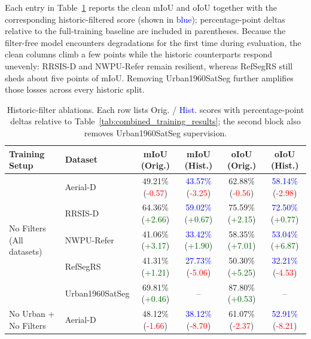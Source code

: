 Each entry in Table~\ref{tab:historic_ablation_results} reports the clean mIoU and oIoU together with the corresponding historic-filtered score (shown in \textcolor{blue}{blue}); percentage-point deltas relative to the full-training baseline are included in parentheses. Because the filter-free model encounters degradations for the first time during evaluation, the clean columns climb a few points while the historic counterparts respond unevenly: RRSIS-D and NWPU-Refer remain resilient, whereas RefSegRS still sheds about five points of mIoU. Removing Urban1960SatSeg further amplifies those losses across every historic split.
\begin{table}[t]
\centering
\caption{Historic-filter ablations. Each row lists Orig. / \textcolor{blue}{Hist.} scores with percentage-point deltas relative to Table~\ref{tab:combined_training_results}; the second block also removes Urban1960SatSeg supervision.}
\label{tab:historic_ablation_results}
\renewcommand{\arraystretch}{1.1}
\begin{tabular}{@{}llcccc@{}}
\toprule
\textbf{Training Setup} & \textbf{Dataset} & \textbf{mIoU (Orig.)} & \textbf{mIoU (Hist.)} & \textbf{oIoU (Orig.)} & \textbf{oIoU (Hist.)} \\
\midrule
\multirow{5}{*}{No Filters (All datasets)} & Aerial-D & 49.21\% (\textcolor{red}{-0.57}) & \textcolor{blue}{43.57\%} (\textcolor{red}{-3.25}) & 62.88\% (\textcolor{red}{-0.56}) & \textcolor{blue}{58.14\%} (\textcolor{red}{-2.98}) \\
 & RRSIS-D & 64.36\% (\textcolor{darkgreen}{+2.66}) & \textcolor{blue}{59.02\%} (\textcolor{darkgreen}{+0.67}) & 75.59\% (\textcolor{darkgreen}{+2.15}) & \textcolor{blue}{72.50\%} (\textcolor{darkgreen}{+0.77}) \\
 & NWPU-Refer & 41.06\% (\textcolor{darkgreen}{+3.17}) & \textcolor{blue}{33.42\%} (\textcolor{darkgreen}{+1.90}) & 58.35\% (\textcolor{darkgreen}{+7.01}) & \textcolor{blue}{53.04\%} (\textcolor{darkgreen}{+6.87}) \\
 & RefSegRS & 41.31\% (\textcolor{darkgreen}{+1.21}) & \textcolor{blue}{27.73\%} (\textcolor{red}{-5.06}) & 50.30\% (\textcolor{darkgreen}{+5.25}) & \textcolor{blue}{32.21\%} (\textcolor{red}{-4.53}) \\
 & Urban1960SatSeg & 69.81\% (\textcolor{darkgreen}{+0.46}) & -- & 87.80\% (\textcolor{darkgreen}{+0.53}) & -- \\
\midrule
\multirow{5}{*}{No Urban + No Filters} & Aerial-D & 48.12\% (\textcolor{red}{-1.66}) & \textcolor{blue}{38.12\%} (\textcolor{red}{-8.70}) & 61.07\% (\textcolor{red}{-2.37}) & \textcolor{blue}{52.91\%} (\textcolor{red}{-8.21}) \\

\end{tabular}
\end{table}
